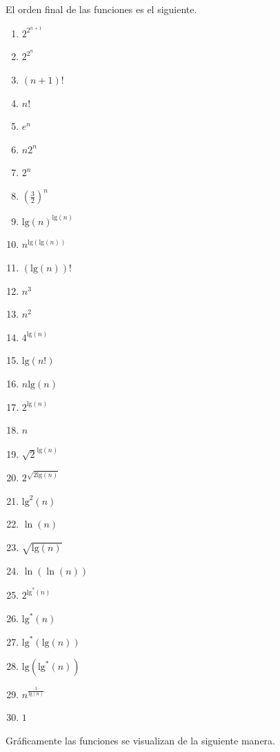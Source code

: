 \documentclass{article}
\begin{document}
El orden final de las funciones es el siguiente.

\begin{enumerate}
    \def\labelenumi{\arabic{enumi}.}
    \itemsep1pt\parskip0pt
    \item $2^{2^{n+1}}$
    \item $2^{2^{n}}$
    \item $(n+1)!$
    \item $n!$
    \item $e^n$
    \item $n 2^n$
    \item $2^n$
    \item $(\frac{3}{2})^n$
    \item $\textrm{lg}(n)^{\textrm{lg}(n)}$ 
    \item $n^{\textrm{lg}( \textrm{lg}(n))}$
    \item $(\textrm{lg}(n))!$
    \item $n^3$
    \item $n^2$
    \item $4^{\textrm{lg}(n)}$ 
    \item $\textrm{lg}(n!)$
    \item $n\textrm{lg}(n)$ 
    \item $2^{\textrm{lg}(n)}$
    \item $n$
    \item $\sqrt{2}^{\textrm{lg}(n)}$
    \item $2^{\sqrt{2 \textrm{lg}(n)}}$
    \item $\textrm{lg}^2(n)$
    \item $\ln (n)$
    \item $\sqrt{\textrm{lg}(n)}$
    \item $\ln(\ln(n))$
    \item $2^{\textrm{lg}^*(n)}$
    \item $\textrm{lg}^*(n)$
    \item $\textrm{lg}^*(\textrm{lg}(n))$
    \item $\textrm{lg}(\textrm{lg}^*(n))$
    \item $n^{\frac{1}{\textrm{lg}(n)}}$
    \item $1$
\end{enumerate}

\clearpage
Gráficamente las funciones se visualizan de la siguiente manera.

\end{document}
